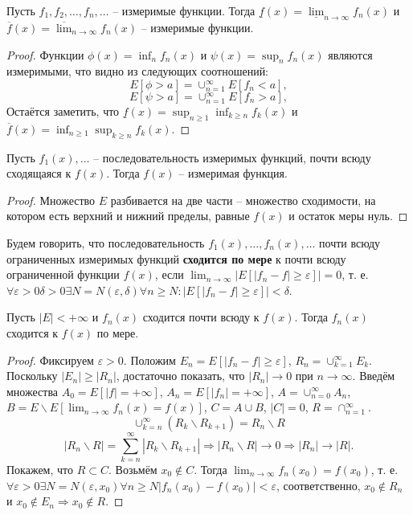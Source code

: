 \documentclass[11pt]{article}
\newcounter{th}\setcounter{th}{0}
\def\th{\par\smallskip\refstepcounter{th}\textbf{\arabic{th}}}
\newtheorem*{Theorem}{Теорема \th}
\begin{document}
\begin{Theorem}
Пусть $f_1, f_2, \ldots, f_n, \ldots$ -- измеримые функции. Тогда
$\underline{f}(x) = \underline{\lim}_{n \to \infty}f_n(x)$ и
$\overline{f}(x) = \overline{\lim}_{n \to \infty}f_n(x)$ -- измеримые функции.
\end{Theorem}
\begin{proof}
Функции $\phi(x) = \inf_nf_n(x)$ и $\psi(x) = \sup_nf_n(x)$ являются измеримыми, что видно из
следующих соотношений:
\begin{equation}
E[\phi > a] = \cup_{n = 1}^{\infty}E[f_n < a],
\end{equation}
\begin{equation}
E[\psi > a] = \cup_{n = 1}^{\infty}E[f_n > a],
\end{equation}
Остаётся заметить, что $\underline{f}(x) = \sup_{n \geq 1}\inf_{k \geq n}f_k(x)$ и
$\overline{f}(x) = \inf_{n \geq 1}\sup_{k \geq n}f_k(x)$.
\end{proof}
\begin{Theorem}
Пусть $f_1(x), \ldots$ -- последовательность измеримых функций, почти всюду сходящаяся к $f(x)$.
Тогда $f(x)$ -- измеримая функция.
\end{Theorem}
\begin{proof}
Множество $E$ разбивается на две части -- множество сходимости, на котором есть верхний и нижний
пределы, равные $f(x)$ и остаток меры нуль.
\end{proof}
Будем говорить, что последовательность \(f_1(x), \ldots, f_n(x), \ldots\) почти всюду
ограниченных измеримых функций \textbf{сходится по мере} к почти всюду ограниченной функции \(f(x)\),
если \(\lim_{n \to \infty}|E[|f_n - f| \geq \varepsilon]| = 0\), т. е.
\(\forall \varepsilon > 0 \delta > 0 \exists N = N(\varepsilon, \delta) \forall n \geq N: |E[|f_n - f| \geq \varepsilon]| < \delta\).
\begin{Theorem}
Пусть $|E| < +\infty$ и $f_n(x)$ сходится почти всюду к $f(x)$. Тогда $f_n(x)$ сходится к
$f(x)$ по мере.
\end{Theorem}
\begin{proof}
Фиксируем $\varepsilon > 0$. Положим $E_n = E[|f_n - f| \geq \varepsilon]$, $R_n = \cup_{k = 1}^{\infty}E_k$.
Поскольку $|E_n| \geq |R_n|$, достаточно показать, что $|R_n| \to 0$ при $n \to \infty$.
Введём множества $A_0 = E[|f| = +\infty]$, $A_n = E[|f_n| = +\infty]$, $A = \cup_{n = 0}^{\infty}A_n$,
$B = E \backslash E[\lim_{n \to \infty}f_n(x) = f(x)]$, $C = A \cup B$, $|C| = 0$, $R = \cap_{n = 1}^{\infty}$.
\begin{equation}
\cup_{k = n}^{\infty}(R_k \backslash R_{k + 1}) = R_n \backslash R
\end{equation}
\begin{equation}
|R_n \backslash R| = \sum_{k = n}^{\infty}|R_k \backslash R_{k + 1}| \Rightarrow |R_n \backslash R|
\to 0 \Rightarrow |R_n| \to |R|.
\end{equation}
Покажем, что $R \subset C$. Возьмём $x_0 \notin C$. Тогда $\lim_{n \to \infty}f_n(x_0) = f(x_0)$,
т. е. $\forall \varepsilon > 0 \exists N = N(\varepsilon, x_0) \forall n \geq N |f_n(x_0) - f(x_0)| < \varepsilon$,
соответственно, $x_0 \notin R_n$ и $x_0 \notin E_n \Rightarrow x_0 \notin R$.
\end{proof}
\end{document}
